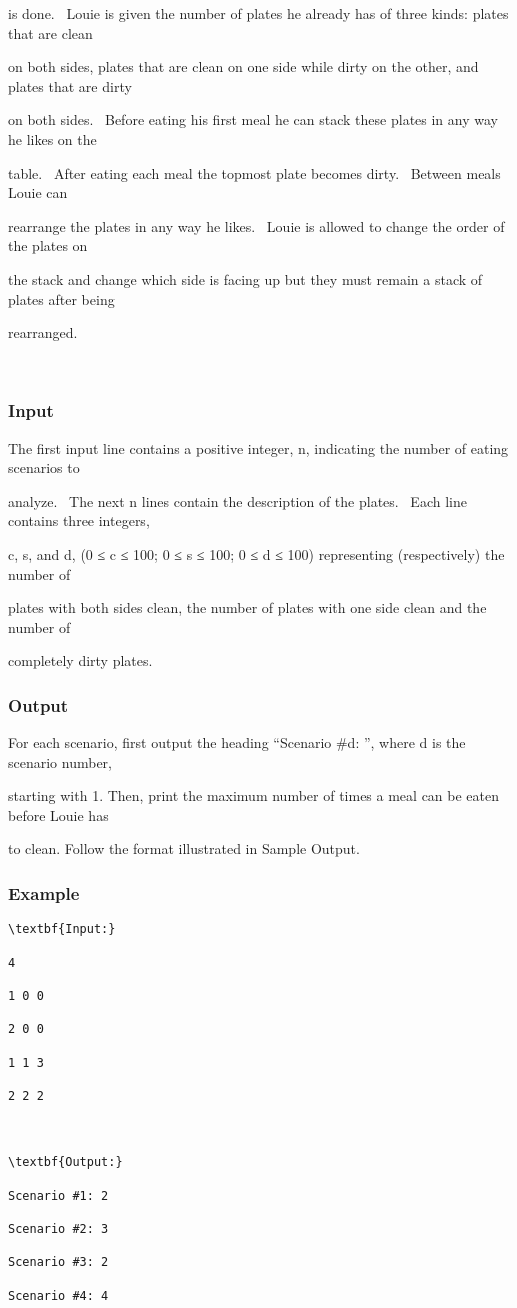 is done.  Louie is given the number of plates he already has of three kinds: plates that are clean 

on both sides, plates that are clean on one side while dirty on the other, and plates that are dirty 

on both sides.  Before eating his first meal he can stack these plates in any way he likes on the 

table.  After eating each meal the topmost plate becomes dirty.  Between meals Louie can 

rearrange the plates in any way he likes.  Louie is allowed to change the order of the plates on 

the stack and change which side is facing up but they must remain a stack of plates after being 

rearranged.

 

\subsubsection{Input}

The first input line contains a positive integer, n, indicating the number of eating scenarios to 

analyze.  The next n lines contain the description of the plates.  Each line contains three integers, 

c, s, and d, (0 ≤ c ≤ 100; 0 ≤ s ≤ 100; 0 ≤ d ≤ 100) representing (respectively) the number of 

plates with both sides clean, the number of plates with one side clean and the number of 

completely dirty plates.

\subsubsection{Output}

For each scenario, first output the heading “Scenario \#d: ”, where d is the scenario number, 

starting with 1. Then, print the maximum number of times a meal can be eaten before Louie has 

to clean. Follow the format illustrated in Sample Output.

\subsubsection{Example}
\begin{verbatim}
\textbf{Input:}

4

1 0 0

2 0 0

1 1 3

2 2 2



\textbf{Output:}

Scenario #1: 2

Scenario #2: 3

Scenario #3: 2

Scenario #4: 4

\end{verbatim}